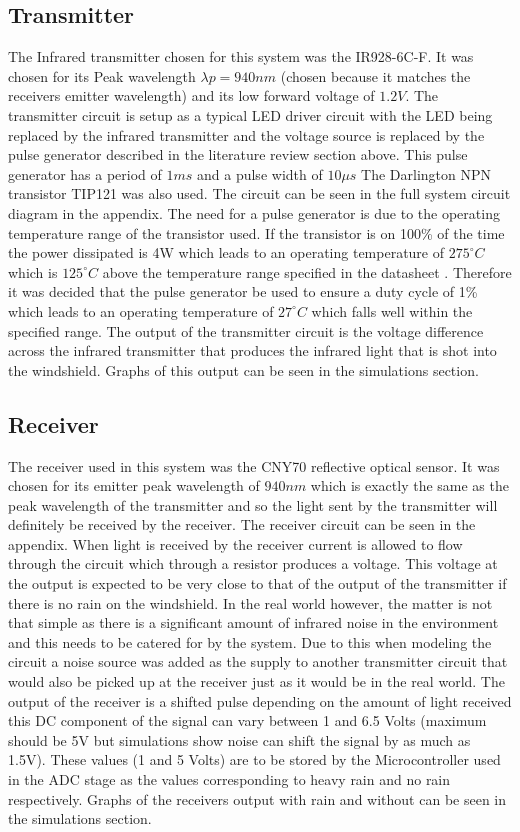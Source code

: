 \documentclass[conference, 11pt]{IEEEtran}
\begin{document}
 \subsection{Transmitter}
 The Infrared transmitter chosen for this system was the IR928-6C-F. It was chosen for its Peak wavelength $λp=940nm$ (chosen because it matches the receivers emitter wavelength) and its low forward voltage of $1.2V$. The transmitter circuit is setup as a typical LED driver circuit with the LED being replaced by the infrared transmitter and the voltage source is replaced by the pulse generator described in the literature review section above. This pulse generator has a period of $1ms$ and a pulse width of $10\mu s$ The Darlington NPN transistor TIP121 was also used. The circuit can be seen in the full system circuit diagram in the appendix. The need for a pulse generator is due to the operating temperature range of the transistor used. If the transistor is on 100\% of the time the power dissipated is 4W which leads to an operating temperature of $275 ^{\circ}C$ which is $125 ^{\circ}C$ above the temperature range specified in the datasheet \cite{TP121}. Therefore it was decided that the pulse generator be used to ensure a duty cycle of 1\% which leads to an operating temperature of $27 ^{\circ}C$ which falls well within the specified range. The output of the transmitter circuit is the voltage difference across the infrared transmitter that produces the infrared light that is shot into the windshield. Graphs of this output can be seen in the simulations section. 

\subsection{Receiver}
The receiver used in this system was the CNY70 reflective optical sensor. It was chosen for its emitter peak wavelength of $940 nm$ which is exactly the same as the peak wavelength of the transmitter and so the light sent by the transmitter will definitely be received by the receiver. The receiver circuit can be seen in the appendix. When light is received by the receiver current is allowed to flow through the circuit which through a resistor produces a voltage. This voltage at the output is expected to be very close to that of the output of the transmitter if there is no rain on the windshield. In the real world however, the matter is not that simple as there is a significant amount of infrared noise in the environment and this needs to be catered for by the system. Due to this when modeling the circuit a noise source was added as the supply to another transmitter circuit that would also be picked up at the receiver just as it would be in the real world. The output of the receiver is a shifted pulse depending on the amount of light received this DC component of the signal can vary between 1 and 6.5 Volts (maximum should be 5V but simulations show noise can shift the signal by as much as 1.5V). These values (1 and 5  Volts) are to be stored by the Microcontroller used in the ADC stage as the values corresponding to heavy rain and no rain respectively. Graphs of the receivers output with rain and without can be seen in the simulations section. 
\end{document}
